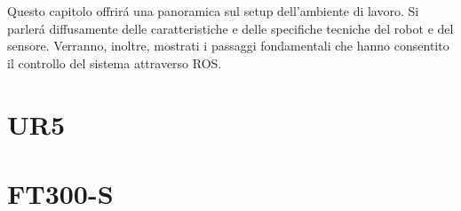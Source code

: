 Questo capitolo offrir\'{a} una panoramica sul setup dell'ambiente di lavoro. 
Si parler\'{a} diffusamente delle caratteristiche e delle specifiche tecniche del robot e del sensore. Verranno, inoltre, 
mostrati i passaggi fondamentali che hanno consentito il controllo del sistema attraverso ROS.

\section{UR5}


\section{FT300-S}

